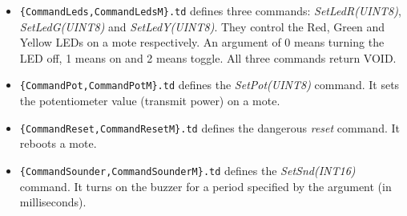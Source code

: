 \documentclass[11pt]{article}
\begin{document}
\begin{itemize}
\begin{itemize}
\item {\tt \{CommandLeds,CommandLedsM\}.td} defines three commands:
{\em SetLedR(UINT8)}, {\em SetLedG(UINT8)} and {\em SetLedY(UINT8)}.
They control the Red, Green and Yellow LEDs on a mote respectively.
An argument of 0 means turning the LED off, 1 means on and 2 means toggle.
All three commands return VOID.
\item {\tt \{CommandPot,CommandPotM\}.td} defines the {\em SetPot(UINT8)}
command.  It sets the potentiometer value (transmit power) on a mote.
\item {\tt \{CommandReset,CommandResetM\}.td} defines the dangerous
{\em reset} command.  It reboots a mote.
\item {\tt \{CommandSounder,CommandSounderM\}.td} defines the 
{\em SetSnd(INT16)} command.  It turns on the buzzer for
a period specified by the argument (in milliseconds).
\end{itemize}
\end{itemize}
\end{document}
